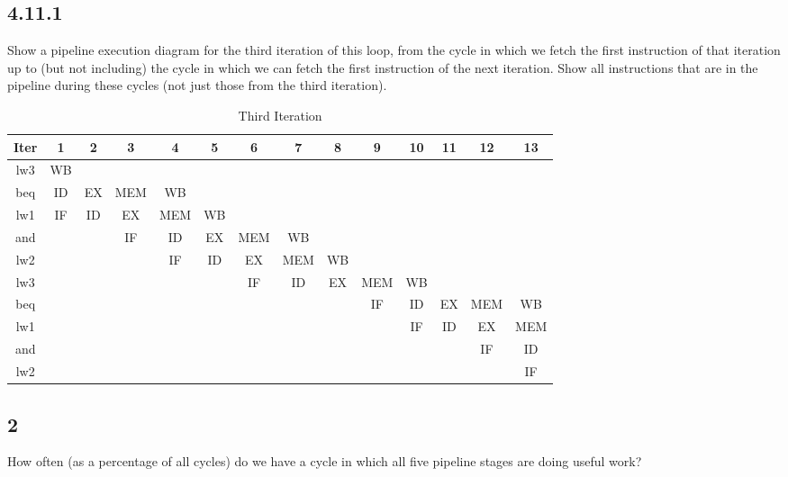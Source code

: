 \documentclass[paper=a4, fontsize=11pt]{scrartcl} %
\begin{document}
\subsection{4.11.1}
\begin{fancyquotes}
    Show a pipeline execution diagram for the third iteration of this loop, from the cycle in which we fetch the first instruction of that iteration up to (but not including) the cycle in which we can fetch the first instruction of the next iteration. Show all instructions that are in the pipeline during these cycles (not just those from the third iteration).
\end{fancyquotes}

\begin{table}[hp]
    \caption{Third Iteration}\label{tab:iteration}
    \begin{center}
        \begin{tabular}{cccccccccccccc}
        \toprule
        \textbf{Iter} & \textbf{1} & \textbf{2} & \textbf{3} & \textbf{4} & \textbf{5}
        & \textbf{6} & \textbf{7} & \textbf{8} & \textbf{9} & \textbf{10} & \textbf{11}
        & \textbf{12} & \textbf{13} \\
        \midrule
        lw3 & WB \\
        beq & ID & EX & MEM & WB \\
        lw1 & IF & ID & EX & MEM & WB \\
        and &    &    & IF & ID & EX & MEM & WB \\
        lw2 &    &    &    & IF & ID & EX & MEM & WB \\
        lw3 &    &    &    &    &    & IF & ID & EX & MEM & WB \\
        beq &    &    &    &    &    &    &    &    & IF & ID & EX & MEM & WB \\
        lw1 &    &    &    &    &    &    &    &    &    & IF & ID & EX & MEM \\
        and &    &    &    &    &    &    &    &    &    &    &    & IF & ID  \\
        lw2 &    &    &    &    &    &    &    &    &    &    &    &    & IF  \\
        \bottomrule
        \end{tabular}
    \end{center}
\end{table}

\subsection{2}
\begin{fancyquotes}
    How often (as a percentage of all cycles) do we have a cycle in which all five pipeline stages are doing useful work?
\end{fancyquotes}
\end{document}
